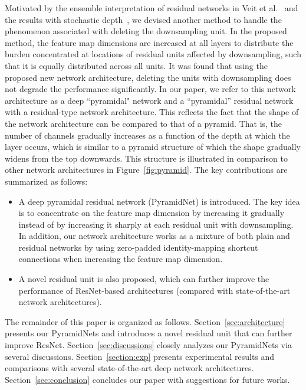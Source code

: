 \documentclass[10pt,twocolumn,letterpaper]{article}
\begin{document}
Motivated by the ensemble interpretation of residual networks in Veit et al.~\cite{ensemble} and the results with stochastic depth~\cite{stochasticdepth}, we devised another method to handle the phenomenon associated with deleting the downsampling unit. In the proposed method, the feature map dimensions are increased at all layers to distribute the burden concentrated at locations of residual units affected by downsampling, such that it is equally distributed across all units. It was found that using the proposed new network architecture, deleting the units with downsampling does not degrade the performance significantly.
In our paper, we refer to this network architecture as a deep ``pyramidal" network and a ``pyramidal'' residual network with a residual-type network architecture. This reflects the fact that the shape of the network architecture can be compared to that of a pyramid. That is, the number of channels gradually increases as a function of the depth at which the layer occurs, which is similar to a pyramid structure of which the shape gradually widens from the top downwards. This structure is illustrated in comparison to other network architectures in Figure~\ref{fig:pyramid}. The key contributions are summarized as follows:

\begin{itemize}
\item A deep pyramidal residual network (PyramidNet) is introduced. The key idea is to concentrate on the feature map dimension by increasing it gradually instead of by increasing it sharply at each residual unit with downsampling. In addition, our network architecture works as a mixture of both plain and residual networks by using zero-padded identity-mapping shortcut connections when increasing the feature map dimension.
\item A novel residual unit is also proposed, which can further improve the performance of ResNet-based architectures (compared with state-of-the-art network architectures).

\end{itemize}

The remainder of this paper is organized as follows. Section~\ref{sec:architecture} presents our PyramidNets and introduces a novel residual unit that can further improve ResNet. Section~\ref{sec:discussions} closely analyzes our PyramidNets via several discussions. Section~\ref{section:exp} presents experimental results and comparisons with several state-of-the-art deep network architectures. Section~\ref{sec:conclusion} concludes our paper with suggestions for future works.
\end{document}
